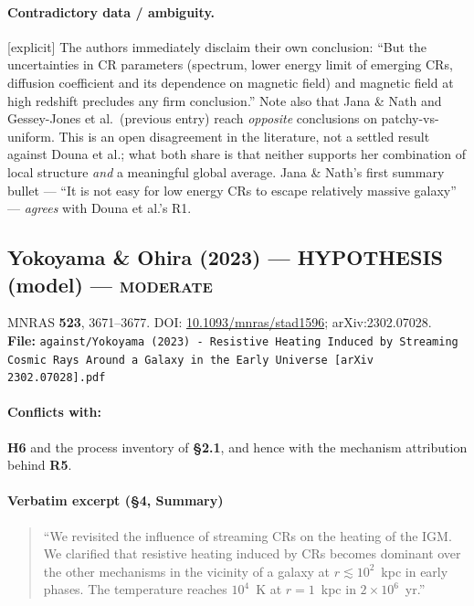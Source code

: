 \documentclass[11pt,a4paper]{article}
\newcommand{\HYP}{\textcolor{blue!60!black}{\textbf{HYPOTHESIS}}}
\newcommand{\flag}[1]{\textcolor{orange!75!black}{\textsf{\small [#1]}}}
\begin{document}
\paragraph{Contradictory data / ambiguity.} \flag{explicit}
The authors immediately disclaim their own conclusion: ``But the uncertainties
in CR parameters (spectrum, lower energy limit of emerging CRs, diffusion
coefficient and its dependence on magnetic field) and magnetic field at high
redshift precludes any firm conclusion.'' Note also that Jana \& Nath and
Gessey-Jones et al.\ (previous entry) reach \emph{opposite} conclusions on
patchy-vs-uniform. This is an open disagreement in the literature, not a settled
result against Douna et al.; what both share is that neither supports her
combination of local structure \emph{and} a meaningful global average.
Jana \& Nath's first summary bullet --- ``It is not easy for low energy CRs to
escape relatively massive galaxy'' --- \emph{agrees} with Douna et al.'s R1.

\subsection{Yokoyama \& Ohira (2023) --- \HYP{} (model) --- \textsc{moderate}}
\noindent MNRAS \textbf{523}, 3671--3677. DOI:
\href{https://doi.org/10.1093/mnras/stad1596}{10.1093/mnras/stad1596};
arXiv:2302.07028.\\
\textbf{File:} \texttt{against/Yokoyama (2023) - Resistive Heating Induced by Streaming Cosmic Rays Around a Galaxy in the Early Universe [arXiv 2302.07028].pdf}

\paragraph{Conflicts with:} \textbf{H6} and the process inventory of \textbf{\S2.1},
and hence with the mechanism attribution behind \textbf{R5}.

\paragraph{Verbatim excerpt (\S4, Summary)}
\begin{quote}\small
``We revisited the influence of streaming CRs on the heating of the IGM. We
clarified that resistive heating induced by CRs becomes dominant over the other
mechanisms in the vicinity of a galaxy at $r\lesssim10^{2}$~kpc in early phases.
The temperature reaches $10^{4}$~K at $r = 1$~kpc in $2\times10^{6}$~yr.''
\end{quote}
\end{document}

